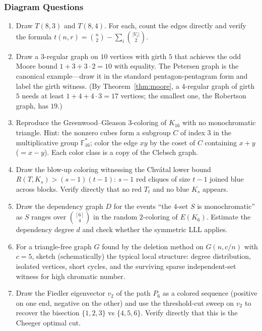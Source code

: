 \documentclass{article}
\theoremstyle{definition}
\begin{document}
\subsubsection{Diagram Questions}
\begin{enumerate}[resume]
\item Draw $T(8, 3)$ and $T(8, 4)$. For each, count the edges directly and
verify the formula $t(n, r) = \binom{n}{2} - \sum_i \binom{|V_i|}{2}$.

\item Draw a $3$-regular graph on $10$ vertices with girth $5$ that achieves
the odd Moore bound $1 + 3 + 3 \cdot 2 = 10$ with equality. The Petersen
graph is the canonical example---draw it in the standard
pentagon-pentagram form and label the girth witness. (By
Theorem~\ref{thm:moore}, a $4$-regular graph of girth $5$ needs at least
$1 + 4 + 4 \cdot 3 = 17$ vertices; the smallest one, the Robertson graph,
has $19$.)

\item Reproduce the Greenwood--Gleason $3$-coloring of $K_{16}$ with no
monochromatic triangle. Hint: the nonzero cubes form a subgroup $C$ of
index $3$ in the multiplicative group $\mathbb F_{16}^{*}$; color the edge
$xy$ by the coset of $C$ containing $x + y$ ($= x - y$). Each color class
is a copy of the Clebsch graph.

\item Draw the blow-up coloring witnessing the Chv\'atal lower
bound $R(T, K_s) > (s - 1)(t - 1)$: $s - 1$ red cliques of size
$t - 1$ joined blue across blocks. Verify directly that no red
$T_t$ and no blue $K_s$ appears.

\item Draw the dependency graph $D$ for the events ``the $4$-set $S$ is
monochromatic'' as $S$ ranges over $\binom{[6]}{4}$ in the
random $2$-coloring of $E(K_6)$. Estimate the dependency degree $d$
and check whether the symmetric LLL applies.

\item For a triangle-free graph $G$ found by the deletion method on
$G(n, c/n)$ with $c = 5$, sketch (schematically) the typical local
structure: degree distribution, isolated vertices, short cycles,
and the surviving sparse independent-set witness for high
chromatic number.

\item Draw the Fiedler eigenvector $v_2$ of the path $P_6$ as a colored
sequence (positive on one end, negative on the other) and use the
threshold-cut sweep on $v_2$ to recover the bisection $\{1, 2, 3\}$
vs $\{4, 5, 6\}$. Verify directly that this is the Cheeger optimal
cut.


\end{enumerate}
\end{document}
